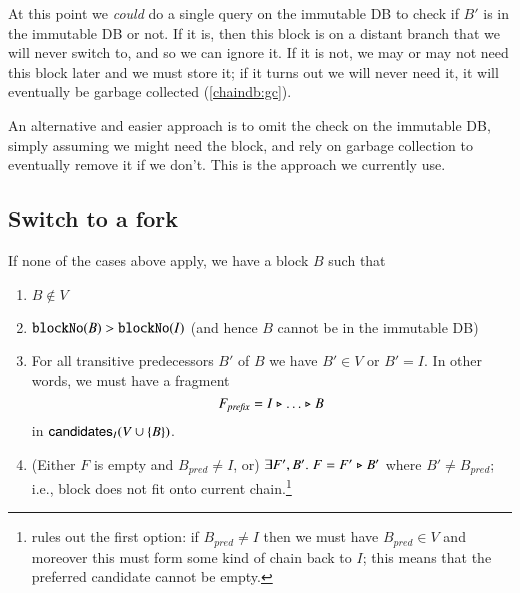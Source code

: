 At this point we \emph{could} do a single query on the immutable DB to check if
$B'$ is in the immutable DB or not. If it is, then this block is on a distant
branch that we will never switch to, and so we can ignore it. If it is not, we
may or may not need this block later and we must store it; if it turns out we
will never need it, it will eventually be garbage collected (\cref{chaindb:gc}).

An alternative and easier approach is to omit the check on the immutable DB,
simply assuming we might need the block, and rely on garbage collection to
eventually remove it if we don't. This is the approach we currently use.

\subsection{Switch to a fork}
\label{chainsel:switchtofork}

If none of the cases above apply, we have a block $B$ such that

\begin{enumerate}
\item \label{chainsel:switchtofork:notinvoldb}
$B \notin V$
\item \label{chainsel:switchtofork:notinimmdb}
$\mathtt{blockNo}(B) > \mathtt{blockNo}(I)$ (and hence $B$ cannot be in the immutable DB)
\item \label{chainsel:switchtofork:connected}
For all transitive predecessors $B'$ of $B$ we have $B' \in V$ or $B' = I$.
In other words, we must have a fragment
$$F_\mathit{prefix} = I \mathrel{\triangleright} \ldots \mathrel{\triangleright} B$$
in $\mathsf{candidates}_I(V \cup \{B\})$.
\item \label{chainsel:switchtofork:doesnotfit}
(Either $F$ is empty and $B_\mathit{pred} \neq I$, or) $\exists F', B' .\;
F = F' \mathrel{\triangleright} B'$ where $B' \neq B_\mathit{pred}$; i.e., block does not fit onto
current chain.\footnote{ rules out the
first option: if $B_\mathit{pred} \neq I$ then we must have $B_\mathit{pred} \in
V$ and moreover this must form some kind of chain back to $I$; this means that
the preferred candidate cannot be empty.}
\end{enumerate}


